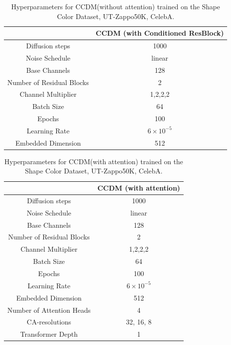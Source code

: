 \begin{table} [H]
    \centering
    \begin{tabular}{cc} 
         \hline
         & CCDM (with Conditioned ResBlock) \\
         \hline
         Diffusion steps & 1000\\
         Noise Schedule & linear \\
         Base Channels & 128 \\
         Number of Residual Blocks & 2\\
         Channel Multiplier & 1,2,2,2 \\
         Batch Size & 64 \\
         Epochs & 100 \\
         Learning Rate & $6 \times 10^{-5}$ \\
         Embedded Dimension & 512 \\
    \bottomrule[0.5mm]
    \end{tabular}
    \caption{Hyperparameters for CCDM(without attention) trained on the Shape Color Dataset, UT-Zappo50K, CelebA.}
    \label{tab:ccdmcondresblock}
\end{table}

\begin{table} [H]
    \centering
    \begin{tabular}{cc} 
         \hline
         & CCDM (with attention) \\
         \hline
         Diffusion steps & 1000\\
         Noise Schedule & linear \\
         Base Channels & 128 \\
         Number of Residual Blocks & 2\\
         Channel Multiplier & 1,2,2,2 \\
         Batch Size & 64 \\
         Epochs & 100 \\
         Learning Rate & $6 \times 10^{-5}$ \\
         Embedded Dimension & 512 \\
         \hline
         Number of Attention Heads & 4 \\
         CA-resolutions & 32, 16, 8 \\
         Transformer Depth & 1 \\
    \bottomrule[0.5mm]
    \end{tabular}
    \caption{Hyperparameters for CCDM(with attention) trained on the Shape Color Dataset, UT-Zappo50K, CelebA.}
    \label{tab:ccdmattention}
\end{table}

